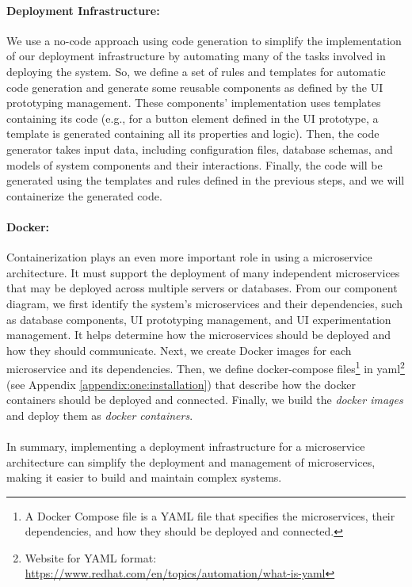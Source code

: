\paragraph{Deployment Infrastructure:}
We use a no-code approach using code generation to simplify the implementation of our deployment infrastructure by automating many of the tasks involved in deploying the system.
So, we define a set of rules and templates for automatic code generation and generate some reusable components as defined by the UI prototyping management. 
These components' implementation uses templates containing its code (e.g., for a button element defined in the UI prototype, a template is generated containing all its properties and logic).
Then, the code generator takes input data, including configuration files, database schemas, and models of system components and their interactions. 
Finally, the code will be generated using the templates and rules defined in the previous steps, and we will containerize the generated code. 

\paragraph{Docker:}
Containerization plays an even more important role in using a microservice architecture. 
It must support the deployment of many independent microservices that may be deployed across multiple servers or databases.
From our component diagram, we first identify the system's microservices and their dependencies, such as database components, UI prototyping management, and UI experimentation management. 
It helps determine how the microservices should be deployed and how they should communicate.
Next, we create Docker images for each microservice and its dependencies.
Then, we define docker-compose files\footnote{A Docker Compose file is a YAML file that specifies the microservices, their dependencies, and how they should be deployed and connected.} in yaml\footnote{Website for YAML format: \url{https://www.redhat.com/en/topics/automation/what-is-yaml}} (see Appendix \ref{appendix:one:installation}) that describe how the docker containers should be deployed and connected.
Finally, we build the \textit{docker images} and deploy them as \textit{docker containers}. \\\\
In summary, implementing a deployment infrastructure for a microservice architecture can simplify the deployment and management of microservices, making it easier to build and maintain complex systems.

